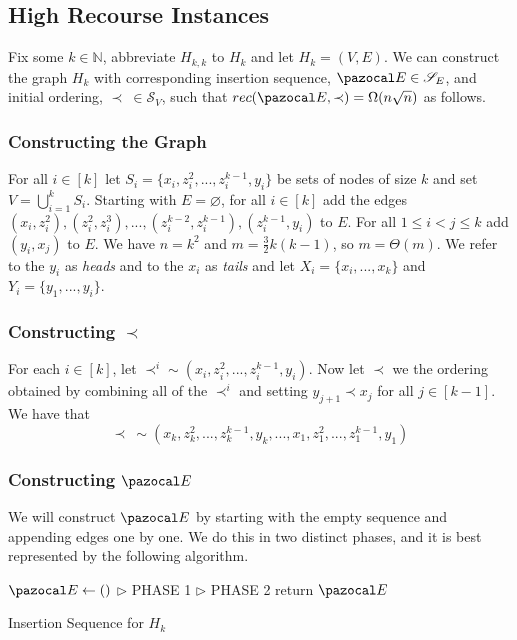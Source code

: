 \documentclass{report}
\begin{document}
\subsection{High Recourse Instances}

Fix some $k \in \mathbb{N}$, abbreviate $H_{k,k}$ to $H_k$ and let $H_k=(V,E)$. We can construct the graph $H_k$ with corresponding insertion sequence, $\pazocal E \in \mathcal S_E$, and initial ordering, $\prec \: \in \mathcal S_V$, such that $rec(\pazocal E, \prec) = \Omega(n\sqrt n)$ as follows.

\subsubsection{Constructing the Graph}

For all $i \in [k]$ let $S_{i} = \{ x_{i}, z_{i}^{2}, ..., z_{i}^{k-1}, y_{i} \}$ be sets of nodes of size $k$ and set $V = \bigcup_{i=1}^{k}S_{i}$. Starting with $E= \varnothing$, for all $i \in [k]$ add the edges $(x_{i}, z_{i}^{2}), (z_{i}^{2}, z_{i}^{3}), ..., (z_{i}^{k-2}, z_{i}^{k-1}), (z_{i}^{k-1}, y_{i})$ to $E$. For all $1 \leq i < j \leq k$ add $(y_i,x_j)$ to $E$. We have $n=k^2$ and $m=\frac{3}{2}k(k-1)$, so $m = \Theta(m)$. We refer to the $y_{i}$ as \textit{heads} and to the $x_{i}$ as \textit{tails} and let $X_i=\{x_i,...,x_k\}$ and $Y_i=\{y_1,...,y_i\}$.

\subsubsection{Constructing $\prec$}

For each $i \in [k]$, let $\prec^i \sim (x_{i}, z_{i}^{2}, ..., z_{i}^{k-1}, y_{i})$. Now let $\prec$ we the ordering obtained by combining all of the $\prec^i$ and setting $y_{j+1} \prec x_{j}$ for all $j \in [k-1]$. We have that
\[ \prec \: \sim (x_k, z_k^{2}, ..., z_k^{k-1}, y_k,...,x_1, z_1^{2},..., z_1^{k-1}, y_1) \]

\subsubsection{Constructing $\pazocal E$}

We will construct $\pazocal E$ by starting with the empty sequence and appending edges one by one. We do this in two distinct phases, and it is best represented by the following algorithm.

\begin{algorithm}[H]\label{oneway}
    \SetAlgoLined
    $\pazocal E \leftarrow ()$\;
    $\triangleright$ PHASE 1\;
    $\triangleright$ PHASE 2\;
    return $\pazocal E$
    \caption{Insertion Sequence for $H_k$}
\end{algorithm}
\end{document}
